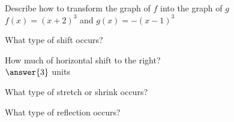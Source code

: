 \documentclass{ximera}
\author{David Kish}
\begin{document}
Describe how to transform the graph of $f$ into the graph of $g$\\

$f(x)=(x+2)^3$ and $g(x) = -(x-1)^3$

\begin{exercise}
What type of shift occurs?
\begin{multipleChoice}
\end{multipleChoice}
\end{exercise}
\begin{exercise}
How much of horizontal shift to the right?\\
$\answer{3}$ units
\end{exercise}
\begin{exercise}
What type of stretch or shrink occurs?
\begin{multipleChoice}
\end{multipleChoice}
\end{exercise}

\begin{exercise}
What type of reflection occurs?
\begin{multipleChoice}
\end{multipleChoice}
\end{exercise}
\end{document}
